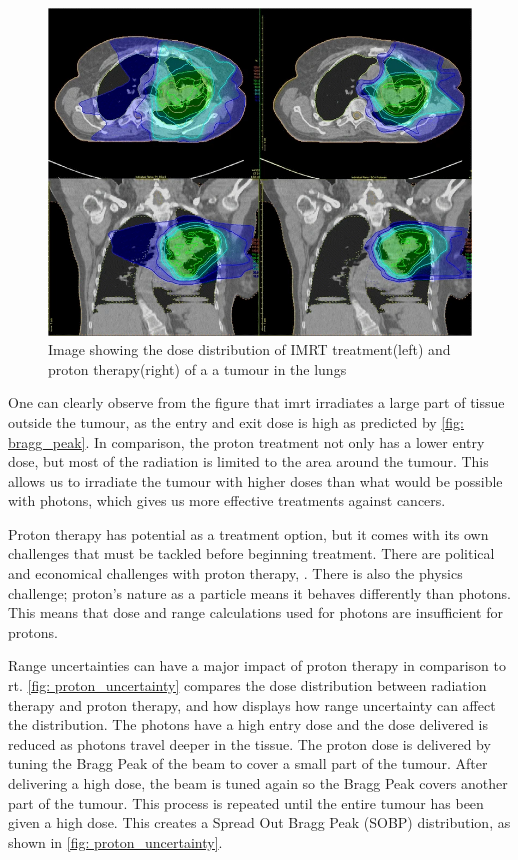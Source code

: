 \documentclass[main.tex]{subfiles}
\begin{document}
\begin{figure}[!htpb]
    \centering
    \includegraphics[width=12cm ]{images/proton_vs_imrt.png}
    \caption{Image showing the dose distribution of IMRT treatment(left) and proton therapy(right) of a a tumour in the lungs\cite{protonimage}}
    \label{fig: imrt_vs_photon}
\end{figure}
\FloatBarrier

One can clearly observe from the figure that \gls{imrt} irradiates a large part of tissue outside the tumour, as the entry and exit dose is high as predicted by \autoref{fig: bragg_peak}. In comparison, the proton treatment not only has a lower entry dose, but most of the radiation is limited to the area around the tumour. This allows us to irradiate the tumour with higher doses than what would be possible with photons, which gives us more effective treatments against cancers.

Proton therapy has potential as a treatment option, but it comes with its own challenges that must be tackled before beginning treatment. There are political and economical challenges with proton therapy,   . There is also the physics challenge; proton's nature as a particle means it behaves differently than photons. This means that dose and range calculations used for photons are insufficient for protons.\cite{proton_challenges}

Range uncertainties can have a major impact of proton therapy in comparison to \gls{rt}. \autoref{fig: proton_uncertainty} compares the dose distribution between radiation therapy and proton therapy, and how displays how range uncertainty can affect the distribution. The photons have a high entry dose and the dose delivered is reduced as photons travel deeper in the tissue. The proton dose is delivered by tuning the Bragg Peak of the beam to cover a small part of the tumour. After delivering a high dose, the beam is tuned again so the Bragg Peak covers another part of the tumour. This process is repeated until the entire tumour has been given a high dose. This creates a Spread Out Bragg Peak (SOBP) distribution, as shown in \autoref{fig: proton_uncertainty}.
\end{document}
